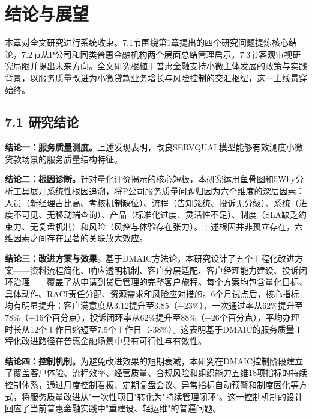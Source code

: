 \chapter{结论与展望}

本章对全文研究进行系统收束。7.1节围绕第1章提出的四个研究问题提炼核心结论，7.2节从P公司和同类普惠金融机构两个层面总结管理启示，7.3节客观审视研究局限并提出未来方向。全文研究根植于普惠金融支持小微主体发展的政策与实践背景\cite{ref2}，以服务质量改进为小微贷款业务增长与风险控制的交汇枢纽，这一主线贯穿始终。
\par

\section{7.1 研究结论}

\textbf{结论一：服务质量测度。}上述发现表明，改良SERVQUAL模型能够有效测度小微贷款场景的服务质量结构特征。
\par

\textbf{结论二：根因诊断。}针对量化评价揭示的核心短板，本研究运用鱼骨图和5Why分析工具展开系统性根因追溯，将P公司服务质量问题归因为六个维度的深层因素：人员（新经理占比高、考核机制缺位）、流程（告知笼统、投诉无分级）、系统（进度不可见、无移动端查询）、产品（标准化过度、灵活性不足）、制度（SLA缺乏约束力、无复盘机制）和风险（风控与体验存在张力）。上述根因并非孤立存在，六维因素之间存在显著的关联放大效应。
\par

\textbf{结论三：改进方案与效果。}基于DMAIC方法论\cite{ref12}，本研究设计了五个工程化改进方案——资料流程简化、响应透明机制、客户分层适配、客户经理能力建设、投诉闭环治理——覆盖了从申请到贷后管理的完整客户旅程。每个方案均包含量化目标、具体动作、RACI责任分配、资源需求和风险应对措施。6个月试点后，核心指标均有明显提升：客户满意度从3.12提升至3.85（+23\%），一次通过率从62\%提升至78\%（+16个百分点），投诉闭环率从62\%提升至88\%（+26个百分点），平均办理时长从12个工作日缩短至7.5个工作日（-38\%）。这表明基于DMAIC的服务质量工程化改进路径在普惠金融场景中具有可行性与有效性。
\par

\textbf{结论四：控制机制。}为避免改进效果的短期衰减，本研究在DMAIC控制阶段建立了覆盖客户体验、流程效率、经营质量、合规风险和组织能力五维18项指标的持续控制体系，通过月度控制看板、定期复盘会议、异常指标自动预警和制度固化等方式，将服务质量改进从"一次性项目"转化为"持续管理闭环"。这一控制机制的设计回应了当前普惠金融实践中"重建设、轻运维"的普遍问题。
\par

